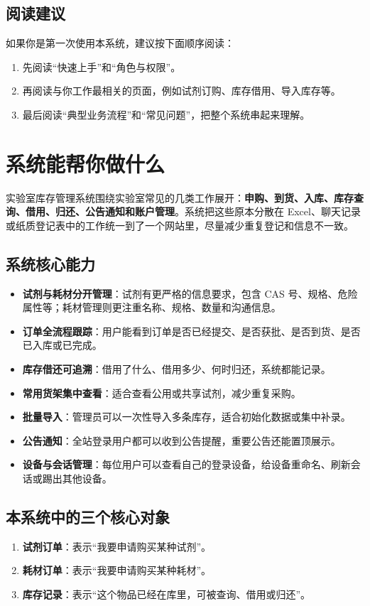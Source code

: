 \documentclass[12pt,a4paper]{ctexart}
\begin{document}
\subsection{阅读建议}
如果你是第一次使用本系统，建议按下面顺序阅读：
\begin{enumerate}
  \item 先阅读“快速上手”和“角色与权限”。
  \item 再阅读与你工作最相关的页面，例如试剂订购、库存借用、导入库存等。
  \item 最后阅读“典型业务流程”和“常见问题”，把整个系统串起来理解。
\end{enumerate}

\newpage
\section{系统能帮你做什么}

实验室库存管理系统围绕实验室常见的几类工作展开：\textbf{申购、到货、入库、库存查询、借用、归还、公告通知和账户管理}。系统把这些原本分散在 Excel、聊天记录或纸质登记表中的工作统一到了一个网站里，尽量减少重复登记和信息不一致。

\subsection{系统核心能力}
\begin{itemize}
  \item \textbf{试剂与耗材分开管理}：试剂有更严格的信息要求，包含 CAS 号、规格、危险属性等；耗材管理则更注重名称、规格、数量和沟通信息。
  \item \textbf{订单全流程跟踪}：用户能看到订单是否已经提交、是否获批、是否到货、是否已入库或已完成。
  \item \textbf{库存借还可追溯}：借用了什么、借用多少、何时归还，系统都能记录。
  \item \textbf{常用货架集中查看}：适合查看公用或共享试剂，减少重复采购。
  \item \textbf{批量导入}：管理员可以一次性导入多条库存，适合初始化数据或集中补录。
  \item \textbf{公告通知}：全站登录用户都可以收到公告提醒，重要公告还能置顶展示。
  \item \textbf{设备与会话管理}：每位用户可以查看自己的登录设备，给设备重命名、刷新会话或踢出其他设备。
\end{itemize}

\subsection{本系统中的三个核心对象}
\begin{enumerate}
  \item \textbf{试剂订单}：表示“我要申请购买某种试剂”。
  \item \textbf{耗材订单}：表示“我要申请购买某种耗材”。
  \item \textbf{库存记录}：表示“这个物品已经在库里，可被查询、借用或归还”。
\end{enumerate}
\end{document}
